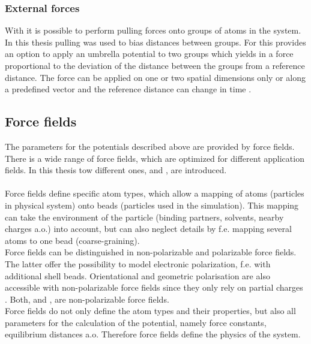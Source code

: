 \subsubsection{External forces}
With \gromacs{} it is possible to perform pulling forces onto groups of atoms in the system. In this thesis pulling was used to bias distances between groups. For this \gromacs{} provides an option to apply an umbrella potential to two groups which yields in a force proportional to the deviation of the distance between the groups from a reference distance. The force can be applied on one or two spatial dimensions only or along a predefined vector and the reference distance can change in time  \autocite[p. 154-159]{gromacsManual}.
\subsection{Force fields}
The parameters for the potentials described above are provided by force fields. There is a wide range of force fields, which are optimized for different application fields. In this thesis tow different ones, \charmm{} and \martini{}, are introduced.\\
\\
Force fields define specific atom types, which allow a mapping of atoms (particles in physical system) onto beads (particles used in the simulation). This mapping can take the environment of the particle (binding partners, solvents, nearby charges a.o.) into account, but can also neglect details by f.e. mapping several atoms to one bead (coarse-graining).\\
Force fields can be distinguished in non-polarizable and polarizable force fields. The latter offer the possibility to model electronic polarization, f.e. with additional shell beads. Orientational and geometric polarisation are also accessible with non-polarizable force fields since they only rely on partial charges \autocite[p. 215ff]{greenBook}. Both, \martini{} and \charmm{}, are non-polarizable force fields.\\  
Force fields do not only define the atom types and their properties, but also all parameters for the calculation of the potential, namely force constants, equilibrium distances a.o. Therefore force fields define the physics of the system.
